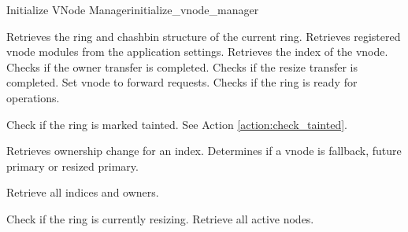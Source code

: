 \begin{actionbox}{Initialize VNode Manager}{initialize_vnode_manager}
	\begin{action}
		 Retrieves the ring and chashbin structure of the current ring.
		 Retrieves registered vnode modules from the application settings.
		 Retrieves the index of the vnode.
		 Checks if the owner transfer is completed.
		 Checks if the resize transfer is completed.
		 Set vnode to forward requests.
		 Checks if the ring is ready for operations.
		\begin{action}
			 Check if the ring is marked tainted.
			See Action \ref{action:check_tainted}.
		\end{action}
		 Retrieves ownership change for an index.
		 Determines if a vnode is fallback, future primary or resized primary.
		\begin{action}
			 Retrieve all indices and owners.
		\end{action}
		 Check if the ring is currently resizing.
		 Retrieve all active nodes.
	\end{action}
\end{actionbox}

